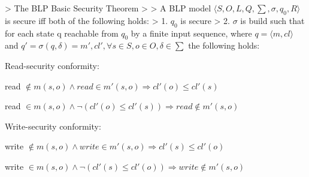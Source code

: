 \documentclass[a4paper]{article}
\begin{document}
\begin{multicols}{3}
    > The BLP Basic Security Theorem
    >
    > A BLP model $⟨S,O,L,Q,\sum,\sigma,q_0,R⟩$ is secure iff both of the following holds:
    > 1. $q_0$ is secure
    > 2. $\sigma$ is build such that for each state q reachable from $q_0$ by a finite input sequence, where $q=⟨m,cl⟩$ and $q'=\sigma(q,\delta)=m',cl',\forall s\in S, o\in O,\delta\in\sum$ the following holds:
    \begin{itemize*}
        \item Read-security conformity:
              \begin{itemize*}
                  \item read $\not\in m(s,o)\wedge read\in m'(s,o)\Rightarrow cl'(o)\leq cl'(s)$
                  \item read $\in m(s,o) \wedge\lnot (cl'(o)\leq cl'(s)) \Rightarrow read \not\in m'(s,o)$
              \end{itemize*}
        \item Write-security conformity:
              \begin{itemize*}
                  \item write $\not\in m(s,o)\wedge write \in m'(s,o)\Rightarrow cl'(s)\leq cl'(o)$
                  \item write $\in m(s,o)\wedge\lnot(cl'(s)\leq cl'(o)) \Rightarrow write \not\in m'(s,o)$
              \end{itemize*}
    \end{itemize*}


\end{multicols}
\end{document}
